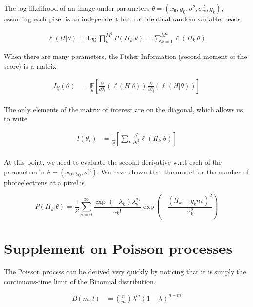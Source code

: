 \documentclass{article}
\begin{document}
\vspace{0.2in}
The log-likelihood of an image under parameters $\theta = (x_{0},y_{0},\sigma^{2},\sigma_{w}^{2},g_{k})$, assuming each pixel is an independent but not identical random variable, reads

\begin{align*}
\ell(H|\theta) = \log\prod_{k}^{M^{2}} P(H_{k}|\theta) = \sum_{k=1}^{M^{2}} \ell (H_{k}|\theta)
\end{align*}


When there are many parameters, the Fisher Information (second moment of the score) is a matrix

\begin{align*}
I_{ij}(\theta) &= \underset{\theta}{\mathbb{E}}\left[\frac{\partial}{\partial\theta_{i}} \left(\ell(H|\theta)\right)\frac{\partial}{\partial\theta_{j}} \left(\ell(H|\theta)\right)\right]\\
\end{align*}

The only elements of the matrix of interest are on the diagonal, which allows us to write

\begin{align*}
I(\theta_{i}) &= \underset{\theta}{\mathbb{E}}\left[\sum_{k}\frac{\partial^{2}}{\partial\theta_{i}^{2}}  \ell (H_{k}|\theta)\right]\\
\end{align*}

At this point, we need to evaluate the second derivative w.r.t each of the parameters in $\theta = (x_{0},y_{0},\sigma^{2})$. We have shown that the model for the number of photoelectrons at a pixel is

\begin{equation*}
P(H_{k}|\theta) = \frac{1}{Z}\sum_{s=0}^{\infty}\frac{\exp\left({-\lambda_{k}}\right)\lambda_{k}^{n_{k}}}{n_{k}!}\exp\left(-\frac{(H_{k}-g_{k}n_{k})^{2}}{\sigma_{k}^{2}}\right)
\end{equation*}


\section{Supplement on Poisson processes}

The Poisson process can be derived very quickly by noticing that it is simply the continuous-time limit of the Binomial distribution.

\begin{align*}
B(m;t) &= {n\choose m}\lambda^{m}(1-\lambda)^{n-m}\\
\end{align*}
\end{document}
